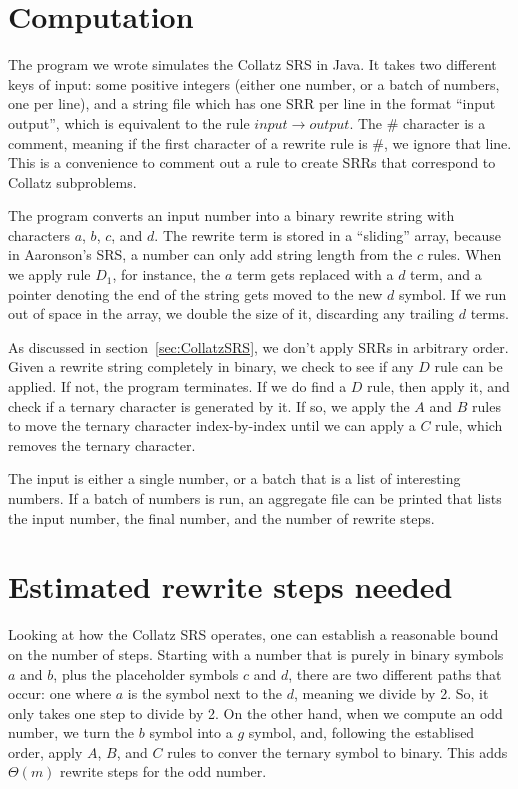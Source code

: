 \section{Computation} \label{subsec:rewritecomp}
The program we wrote simulates the Collatz SRS in Java. It takes two different keys of input: some positive integers (either one number, or a batch of numbers, one per line), and a string file which has one SRR per line in the format ``input output'', which is equivalent to the rule $input \rightarrow output$. The \# character is a comment, meaning if the first character of a rewrite rule is \#, we ignore that line. This is a convenience to comment out a rule to create SRRs that correspond to Collatz subproblems. \par
The program converts an input number into a binary rewrite string with characters $a$, $b$, $c$, and $d$. The rewrite term is stored in a ``sliding'' array, because in Aaronson's SRS, a number can only add string length from the $c$ rules. When we apply rule $D_1$, for instance, the $a$ term gets replaced with a $d$ term, and a pointer denoting the end of the string gets moved to the new $d$ symbol. If we run out of space in the array, we double the size of it, discarding any trailing $d$ terms. \par
As discussed in section~\ref{sec:CollatzSRS}, we don't apply SRRs in arbitrary order. Given a rewrite string completely in binary, we check to see if any $D$ rule can be applied. If not, the program terminates. If we do find a $D$ rule, then apply it, and check if a ternary character is generated by it. If so, we apply the $A$ and $B$ rules to move the ternary character index-by-index until we can apply a $C$ rule, which removes the ternary character. \par
The input is either a single number, or a batch that is a list of interesting numbers. If a batch of numbers is run, an aggregate file can be printed that lists the input number, the final number, and the number of rewrite steps.

\section{Estimated rewrite steps needed} \label{subsec:estrwsteps}
Looking at how the Collatz SRS operates, one can establish a reasonable bound on the number of steps. Starting with a number that is purely in binary symbols $a$ and $b$, plus the placeholder symbols $c$ and $d$, there are two different paths that occur: one where $a$ is the symbol next to the $d$, meaning we divide by 2. So, it only takes one step to divide by 2. On the other hand, when we compute an odd number, we turn the $b$ symbol into a $g$ symbol, and, following the establised order, apply $A$, $B$, and $C$ rules to conver the ternary symbol to binary. This adds $\Theta(m)$ rewrite steps for the odd number. \par

